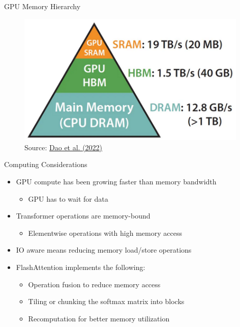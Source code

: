 \begin{vbframe}{GPU Memory Hierarchy}

\vfill

\begin{figure}
	\centering
	\includegraphics[width = 11cm]{./figure/gpu_mem.png} \\ 
	{\footnotesize Source: \href{https://arxiv.org/abs/2205.14135}{Dao et al. (2022)}}
\end{figure}

\vfill

\end{vbframe}


\begin{vbframe}{Computing Considerations}

\vfill

\begin{itemize}
	\item GPU compute has been growing faster than memory bandwidth
	\begin{itemize}
		\item GPU has to wait for data
	\end{itemize}
	\item Transformer operations are memory-bound
	\begin{itemize}
		\item Elementwise operations with high memory access
	\end{itemize}
	\item IO aware means reducing memory load/store operations
	\item FlashAttention implements the following:
	\begin{itemize}
		\item Operation fusion to reduce memory access
		\item Tiling or chunking the softmax matrix into blocks
		\item Recomputation for better memory utilization
	\end{itemize}
\end{itemize}

\vfill

\end{vbframe}

